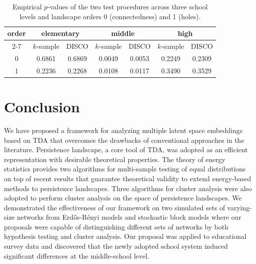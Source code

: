 \documentclass[12pt]{article}
\newcommand{\Erdos}{Erd\H{o}s}
\newcommand{\Renyi}{R\'{e}nyi }
\begin{document}
\begin{table}[htbp]
	\begin{center}
		\begin{tabular}{c|c|c|c|c|c|c}
		\hline
			\multirow{2}{*}{order} & \multicolumn{2}{c|}{elementary} & \multicolumn{2}{c|}{middle} & \multicolumn{2}{c}{high} \\
			\cline{2-7}
			& $k$-sample       & DISCO       &   $k$-sample       & DISCO           
			&  $k$-sample       & DISCO            \\ \hline 
			0 & 0.6861 & 0.6869 & 0.0049 & 0.0053 & 0.2249 & 0.2309\\
			1 & 0.2236 & 0.2268 & 0.0108 & 0.0117 & 0.3490 & 0.3529\\
			\hline
		\end{tabular}	
	\end{center}
	\caption{Empirical $p$-values of the two test procedures across three school levels and landscape orders 0 (connectedness) and 1 (holes).}
	\label{table:real_hypothesis}
\end{table}


\section{Conclusion}\label{sec:conclusion}

We have proposed a framework for analyzing multiple latent space embeddings based on TDA that overcomes the drawbacks of conventional approaches in the literature. Persistence landscape, a core tool of TDA, was adopted as an efficient representation with desirable theoretical properties. The theory of energy statistics provides two algorithms for multi-sample testing of equal distributions on top of recent results that guarantee theoretical validity to extend energy-based methods to persistence landscapes. Three algorithms for cluster analysis were also adopted to perform cluster analysis on the space of persistence landscapes. We demonstrated the effectiveness of our framework on two simulated sets of varying-size networks from \Erdos-\Renyi models and stochastic block models where our proposals were capable of distinguishing different sets of networks by both hypothesis testing and cluster analysis. Our proposal was applied to educational survey data and discovered that the newly adopted school system induced significant differences at the middle-school level.
\end{document}
